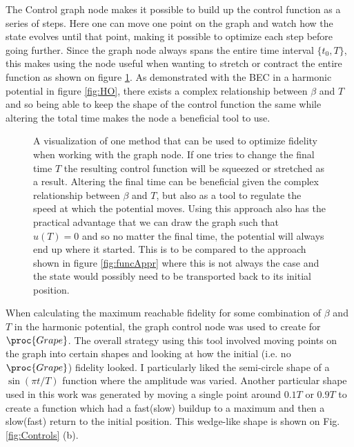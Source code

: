 \documentclass[a4paper, twocolumn]{revtex4-1}
\begin{document}
The Control graph node makes it possible to build up the control function as a series of steps. Here one can move one point on the graph and watch how the state evolves until that point, making it possible to optimize each step before going further. Since the graph node always spans the entire time interval $\{t_0,T\}$, this makes using the node useful when wanting to stretch or contract the entire function as shown on figure \ref{fig:graphAppr}. As demonstrated with the BEC in a harmonic potential in figure \ref{fig:HO}, there exists a complex relationship between $\beta$ and $T$ and so being able to keep the shape of the control function the same while altering the total time makes the node a beneficial tool to use.\\

\begin{figure}
	\def\svgwidth{\columnwidth}
	
	\caption{A visualization of one method that can be used to optimize fidelity when working with the graph node. If one tries to change the final time $T$ the resulting control function will be squeezed or stretched as a result. Altering the final time can be beneficial given the complex relationship between $\beta$ and $T$, but also as a tool to regulate the speed at which the potential moves. Using this approach also has the practical advantage that we can draw the graph such that $u(T)=0$ and so no matter the final time, the potential will always end up where it started. This is to be compared to the approach shown in figure \ref{fig:funcAppr} where this is not always the case and the state would possibly need to be transported back to its initial position.}
	\label{fig:graphAppr}
\end{figure}

When calculating the maximum reachable fidelity for some combination of $\beta$ and $T$ in the harmonic potential, the graph control node was used to create for $\proc{Grape}$. The overall strategy using this tool involved moving points on the graph into certain shapes and looking at how the initial (i.e. no $\proc{Grape}$) fidelity looked. I particularly liked the semi-circle shape of a $\sin(\pi t/T)$ function where the amplitude was varied. Another particular shape used in this work was generated by moving a single point around $0.1T$ or $0.9T$ to create a function which had a fast(slow) buildup to a maximum and then a slow(fast) return to the initial position. This wedge-like shape is shown on Fig. \ref{fig:Controls} (b).
\end{document}
